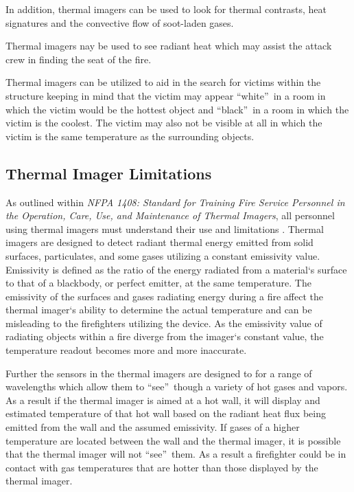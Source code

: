 \documentclass[12pt,oneside]{book}
\begin{document}
In addition, thermal imagers can be used to look for thermal contrasts, heat signatures and the convective flow of soot-laden gases.  

Thermal imagers nay be used to see radiant heat which may assist the attack crew in finding the seat of the fire.

Thermal imagers can be utilized to aid in the search for victims within the structure keeping in mind that the victim may appear \textquotedblleft white\textquotedblright \ in a room in which the victim would be the hottest object and \textquotedblleft black\textquotedblright \ in a room in which the victim is the coolest. The victim may also not be visible at all in which the victim is the same temperature as the surrounding objects.

\subsection{Thermal Imager Limitations}
As outlined within \textit{NFPA 1408: Standard for Training Fire Service Personnel in the Operation, Care, Use, and Maintenance of Thermal Imagers}, all personnel using thermal imagers must understand their use and limitations \cite{NFPA1408}. Thermal imagers are designed to detect radiant thermal energy emitted from solid surfaces, particulates, and some gases utilizing a constant emissivity value. Emissivity is defined as the ratio of the energy radiated from a material`s surface to that of a blackbody, or perfect emitter, at the same temperature. The emissivity of the surfaces and gases radiating energy during a fire affect the thermal imager`s ability to determine the actual temperature and can be misleading to the firefighters utilizing the device. As the emissivity value of radiating objects within a fire diverge from the imager`s constant value, the temperature readout becomes more and more inaccurate.

Further the sensors in the thermal imagers are designed to for a range of wavelengths which allow them to \textquotedblleft see\textquotedblright \ though a variety of hot gases and vapors. As a result if the thermal imager is aimed at a hot wall, it will display and estimated temperature of that hot wall based on the radiant heat flux being emitted from the wall and the assumed emissivity. If gases of a higher temperature are located between the wall and the thermal imager, it is possible that the thermal imager will not \textquotedblleft see\textquotedblright \ them. As a result a firefighter could be in contact with gas temperatures that are hotter than those displayed by the thermal imager.  
\end{document}
